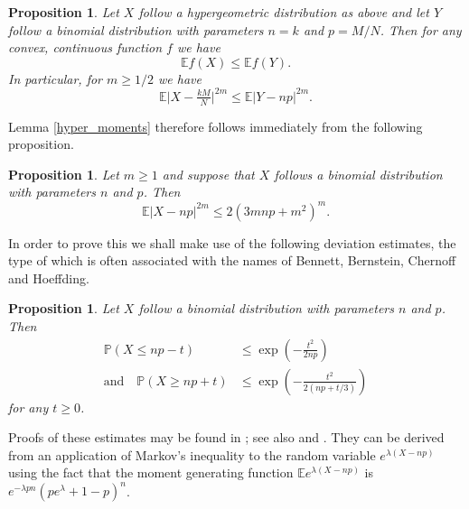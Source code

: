 \documentclass[12pt,a4paper,reqno]{amsart}
\numberwithin{equation}{section}
\theoremstyle{plain}
\newtheorem{proposition}[theorem]{Proposition}
\theoremstyle{definition}
\renewcommand{\leq}{\leqslant}
\renewcommand{\geq}{\geqslant}
\def\E{\mathbb{E}}
\def\P{\mathbb{P}}
\providecommand{\abs}[1]{\lvert#1\rvert}
\begin{document}
\begin{proposition}
Let $X$ follow a hypergeometric distribution as above and let $Y$ follow a binomial distribution with parameters $n = k$ and $p = M/N$. Then for any convex, continuous function $f$ we have 
\[ \E f(X) \leq \E f(Y). \]
In particular, for $m \geq 1/2$ we have
\[ \E \abs{ X - \tfrac{k M}{N} }^{2m} \leq \E \abs{ Y - np }^{2m}. \]
\end{proposition}

Lemma \ref{hyper_moments} therefore follows immediately from the following proposition.

\begin{proposition}\label{binomial_moments}
Let $m \geq 1$ and suppose that $X$ follows a binomial distribution with parameters $n$ and $p$. Then
\begin{equation}
\E |X - np|^{2m} \leq 2(3m n p + m^2)^m. \label{binom_conditional_estimate}
\end{equation}
\end{proposition}

In order to prove this we shall make use of the following deviation estimates, the type of which is often associated with the names of Bennett, Bernstein, Chernoff and Hoeffding.

\begin{proposition}\label{binomial_deviations}
Let $X$ follow a binomial distribution with parameters $n$ and $p$. Then
\begin{align}
\P(X \leq np - t) &\leq \exp\left(-\frac{t^2}{2np}\right) \label{binom_small} \\
\text{and} \quad \P(X \geq np + t) &\leq \exp\left(-\frac{t^2}{2(np + t/3)}\right) \label{binom_large}
\end{align}
for any $t \geq 0$.
\end{proposition}

Proofs of these estimates may be found in \cite{janson}; see also \cite{bollobas:random_graphs} and \cite{alon-spencer}. They can be derived from an application of Markov's inequality to the random variable $e^{\lambda(X-np)}$ using the fact that the moment generating function $\E e^{\lambda(X - np)}$ is $e^{-\lambda p n} (p e^{\lambda} + 1-p)^n$.
\end{document}
